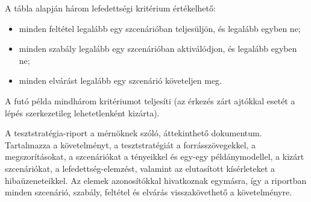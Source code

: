 A tábla alapján három lefedettségi kritérium értékelhető:
\begin{itemize}
	\item minden feltétel legalább egy szcenárióban teljesüljön, és legalább egyben ne;
	\item minden szabály legalább egy szcenárióban aktiválódjon, és legalább egyben ne;
	\item minden elvárást legalább egy szcenárió követeljen meg.
\end{itemize}
A futó példa mindhárom kritériumot teljesíti (az érkezés zárt ajtókkal esetét a  lépés szerkezetileg lehetetlenként kizárta).

A  tesztstratégia-riport a mérnöknek szóló, áttekinthető dokumentum. Tartalmazza a követelményt, a tesztstratégiát a forrásszövegekkel, a megszorításokat, a szcenáriókat a tényeikkel és egy-egy példánymodellel, a kizárt szcenáriókat, a lefedettség-elemzést, valamint az elutasított kísérleteket a hibaüzeneteikkel. Az elemek azonosítókkal hivatkoznak egymásra, így a riportban minden szcenárió, szabály, feltétel és elvárás visszakövethető a követelményre.
